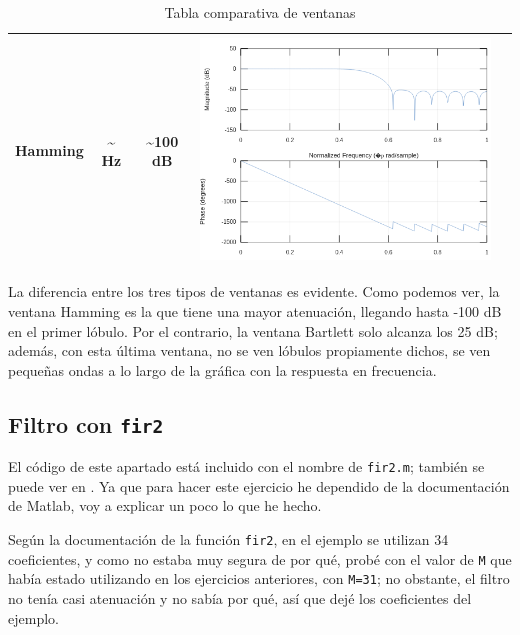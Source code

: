 \documentclass[11pt,a4paper]{article}
\begin{document}
\begin{table}[H]
\begin{tabular}{|c|c|c|c|c|}
Hamming & \textasciitilde{} Hz            & \textasciitilde{}100 dB                       & \includegraphics[scale=0.25]{img/8.png} & \color{deepred}\nameref{code7}\color{black} \\ \hline
\end{tabular}
\caption{Tabla comparativa de ventanas}
\end{table}

La diferencia entre los tres tipos de ventanas es evidente. Como podemos ver, la ventana Hamming es la que tiene una mayor atenuación, llegando hasta -100 dB en el primer lóbulo. Por el contrario, la ventana Bartlett solo alcanza los 25 dB; además, con esta última ventana, no se ven lóbulos propiamente dichos, se ven pequeñas ondas a lo largo de la gráfica con la respuesta en frecuencia.

\newpage

\subsection{Filtro con \texttt{fir2}}

El código de este apartado está incluido con el nombre de \texttt{fir2.m}; también se puede ver en \color{deepred}\color{black}. Ya que para hacer este ejercicio he dependido de la documentación de Matlab, voy a explicar un poco lo que he hecho.

Según la documentación de la función \texttt{fir2}, en el ejemplo se utilizan 34 coeficientes, y como no estaba muy segura de por qué, probé con el valor de \texttt{M} que había estado utilizando en los ejercicios anteriores, con \texttt{M=31}; no obstante, el filtro no tenía casi atenuación y no sabía por qué, así que dejé los coeficientes del ejemplo.\\
\end{document}
